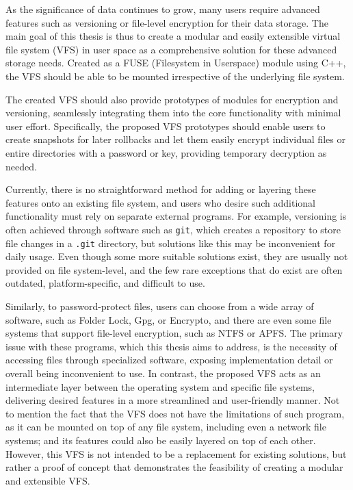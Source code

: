 
As the significance of data continues to grow, many users require advanced features such as versioning or file-level encryption for their data storage.
The main goal of this thesis is thus to create a modular and easily extensible virtual file system (VFS) in user space as a comprehensive solution for these advanced storage needs.
Created as a FUSE (Filesystem in Userspace) module using C++, the VFS should be able to be mounted irrespective of the underlying file system.

The created VFS should also provide prototypes of modules for encryption and versioning, seamlessly integrating them into the core functionality with minimal user effort.
Specifically, the proposed VFS prototypes should enable users to create snapshots for later rollbacks and let them easily encrypt individual files or entire directories with a password or key, providing temporary decryption as needed.

Currently, there is no straightforward method for adding or layering these features onto an existing file system, and users who desire such additional functionality must rely on separate external programs.
For example, versioning is often achieved through software such as \texttt{git}, which creates a repository to store file changes in a \texttt{.git} directory, but solutions like this may be inconvenient for daily usage.
Even though some more suitable solutions exist, they are usually not provided on file system-level, and the few rare exceptions that do exist are often outdated, platform-specific, and difficult to use.

Similarly, to password-protect files, users can choose from a wide array of software, such as Folder Lock, Gpg, or Encrypto, and there are even some file systems that support file-level encryption, such as NTFS or APFS\@.
The primary issue with these programs, which this thesis aims to address, is the necessity of accessing files through specialized software, exposing implementation detail or overall being inconvenient to use.
In contrast, the proposed VFS acts as an intermediate layer between the operating system and specific file systems, delivering desired features in a more streamlined and user-friendly manner.
Not to mention the fact that the VFS does not have the limitations of such program, as it can be mounted on top of any file system, including even a network file systems; and its features could also be easily layered on top of each other.
However, this VFS is not intended to be a replacement for existing solutions, but rather a proof of concept that demonstrates the feasibility of creating a modular and extensible VFS\@.

